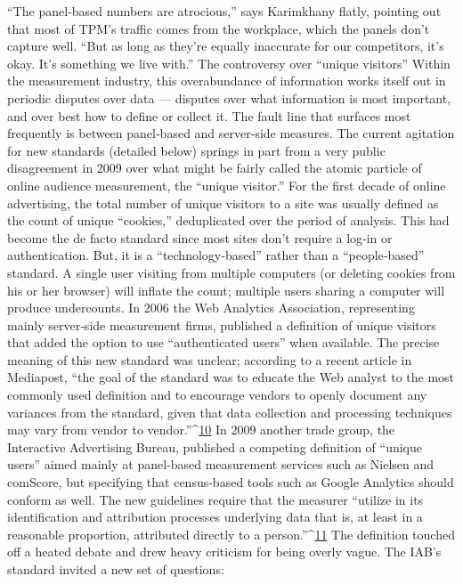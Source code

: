 ``The panel‐based numbers are atrocious,'' says Karimkhany flatly,
pointing out that most of TPM’s traffic comes from the workplace, which
the panels don’t capture well. ``But as long as they’re equally inaccurate
for our competitors, it’s okay. It’s something we live with.''
The controversy over ``unique visitors''
Within the measurement industry, this overabundance of information
works itself out in periodic disputes over data — disputes over what
information is most important, and over best how to define or collect it.
The fault line that surfaces most frequently is between panel‐based and
server‐side measures. The current agitation for new standards (detailed
below) springs in part from a very public disagreement in 2009 over what
might be fairly called the atomic particle of online audience measurement,
the ``unique visitor.''
For the first decade of online advertising, the total number of unique
visitors to a site was usually defined as the count of unique ``cookies,'' deduplicated
over the period of analysis. This had become the de facto
standard since most sites don’t require a log‐in or authentication. But, it is
a ``technology‐based'' rather than a ``people‐based'' standard. A single
user visiting from multiple computers (or deleting cookies from his or her
browser) will inflate the count; multiple users sharing a computer will
produce undercounts.
In 2006 the Web Analytics Association, representing mainly server‐side
measurement firms, published a definition of unique visitors that added
the option to use ``authenticated users'' when available. The precise
meaning of this new standard was unclear; according to a recent article in
Mediapost, ``the goal of the standard was to educate the Web analyst to the
most commonly used definition and to encourage vendors to openly
document any variances from the standard, given that data collection and
processing techniques may vary from vendor to vendor.''^{\href{#endnotes}{10}}
In 2009 another trade group, the Interactive Advertising Bureau,
published a competing definition of ``unique users'' aimed mainly at
panel‐based measurement services such as Nielsen and comScore, but
specifying that census‐based tools such as Google Analytics should
conform as well. The new guidelines require that the measurer ``utilize in
its identification and attribution processes underlying data that is, at least
in a reasonable proportion, attributed directly to a person.''^{\href{#endnotes}{11}}
The definition touched off a heated debate and drew heavy criticism for
being overly vague. The IAB’s standard invited a new set of questions:
